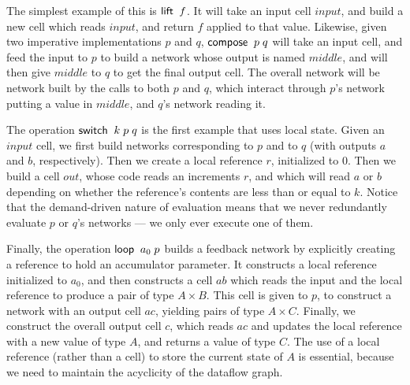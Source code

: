 \documentclass[preprint,natbib]{sigplanconf}
\begin{document}
The simplest example of this is $\mbox{\textsf{{lift}}}\;\;f$. It will take an input
cell $input$, and build a new cell which reads $input$, and return $f$
applied to that value. Likewise, given two imperative implementations $p$
and $q$, $\mbox{\textsf{{compose}}}\;\;p\;q$ will take an input cell, and feed the
input to $p$ to build a network whose output is named $middle$, and
will then give $middle$ to $q$ to get the final output cell. The
overall network will be network built by the calls to both $p$ and
$q$, which interact through $p$'s network putting a value in $middle$,
and $q$'s network reading it.

The operation $\mbox{\textsf{{switch}}}\;\;k\;p\;q$ is the first example that uses 
local state. Given an $input$ cell, we first build networks corresponding
to $p$ and to $q$ (with outputs $a$ and $b$, respectively). Then we
create a local reference $r$, initialized to $0$. Then we build a cell $out$,
whose code reads an increments $r$, and which will read $a$ or $b$ depending
on whether the reference's contents are less than or equal to $k$. Notice
that the demand-driven nature of evaluation means that we never redundantly
evaluate $p$ or $q$'s networks --- we only ever execute one of them. 

Finally, the operation $\mbox{\textsf{{loop}}}\;\;a_0\;p$ builds a feedback network by
explicitly creating a reference to hold an accumulator parameter. It
constructs a local reference initialized to $a_0$, and then constructs
a cell $ab$ which reads the input and the local reference to produce a
pair of type $A \times B$. This cell is given to $p$, to construct a
network with an output cell $ac$, yielding pairs of type $A \times
C$. Finally, we construct the overall output cell $c$, which reads
$ac$ and updates the local reference with a new value of type $A$, and
returns a value of type $C$. The use of a local reference (rather than
a cell) to store the current state of $A$ is essential, because we need
to maintain the acyclicity of the dataflow graph. 
\end{document}

